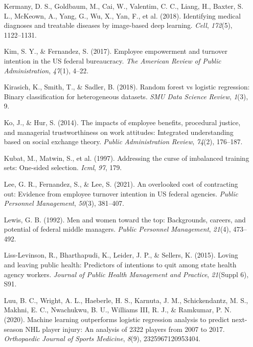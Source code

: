 \documentclass[
  jou]{apa6}
\newlength{\cslhangindent}
\newlength{\cslentryspacingunit} %
\newenvironment{CSLReferences}[2] %
 {%
  \setlength{\parindent}{0pt}
  \ifodd #1
  \let\oldpar\par
  \def\par{\hangindent=\cslhangindent\oldpar}
  \fi
  \setlength{\parskip}{#2\cslentryspacingunit}
 }%
 {}
\begin{document}
\begin{CSLReferences}{1}{0}
\leavevmode{}%
Kermany, D. S., Goldbaum, M., Cai, W., Valentim, C. C., Liang, H., Baxter, S. L., McKeown, A., Yang, G., Wu, X., Yan, F., et al. (2018). Identifying medical diagnoses and treatable diseases by image-based deep learning. \emph{Cell}, \emph{172}(5), 1122--1131.

\leavevmode{}%
Kim, S. Y., \& Fernandez, S. (2017). Employee empowerment and turnover intention in the US federal bureaucracy. \emph{The American Review of Public Administration}, \emph{47}(1), 4--22.

\leavevmode{}%
Kirasich, K., Smith, T., \& Sadler, B. (2018). Random forest vs logistic regression: Binary classification for heterogeneous datasets. \emph{SMU Data Science Review}, \emph{1}(3), 9.

\leavevmode{}%
Ko, J., \& Hur, S. (2014). The impacts of employee benefits, procedural justice, and managerial trustworthiness on work attitudes: Integrated understanding based on social exchange theory. \emph{Public Administration Review}, \emph{74}(2), 176--187.

\leavevmode{}%
Kubat, M., Matwin, S., et al. (1997). Addressing the curse of imbalanced training sets: One-sided selection. \emph{Icml}, \emph{97}, 179.

\leavevmode{}%
Lee, G. R., Fernandez, S., \& Lee, S. (2021). An overlooked cost of contracting out: Evidence from employee turnover intention in US federal agencies. \emph{Public Personnel Management}, \emph{50}(3), 381--407.

\leavevmode{}%
Lewis, G. B. (1992). Men and women toward the top: Backgrounds, careers, and potential of federal middle managers. \emph{Public Personnel Management}, \emph{21}(4), 473--492.

\leavevmode{}%
Liss-Levinson, R., Bharthapudi, K., Leider, J. P., \& Sellers, K. (2015). Loving and leaving public health: Predictors of intentions to quit among state health agency workers. \emph{Journal of Public Health Management and Practice}, \emph{21}(Suppl 6), S91.

\leavevmode{}%
Luu, B. C., Wright, A. L., Haeberle, H. S., Karnuta, J. M., Schickendantz, M. S., Makhni, E. C., Nwachukwu, B. U., Williams III, R. J., \& Ramkumar, P. N. (2020). Machine learning outperforms logistic regression analysis to predict next-season NHL player injury: An analysis of 2322 players from 2007 to 2017. \emph{Orthopaedic Journal of Sports Medicine}, \emph{8}(9), 2325967120953404.


\end{CSLReferences}
\end{document}
